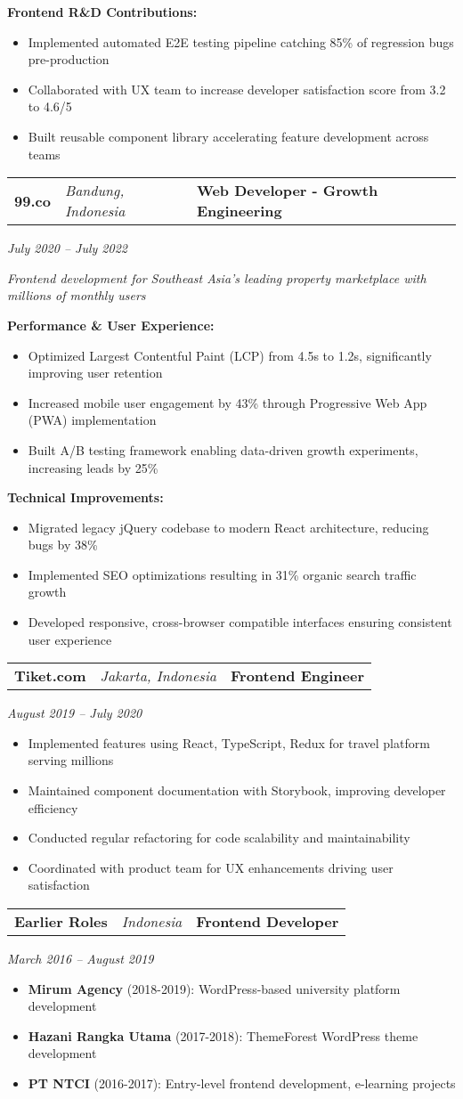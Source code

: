 \documentclass[a4paper, 11pt]{article}
\newcommand{\resumeItem}[1]{
  \item\small{
    {#1 \vspace{-2pt}}
  }
}
\newcommand{\resumeSubheading}[4]{
  \vspace{-2pt}\item
    \begin{tabularx}{0.987\textwidth}[t]{ 
  >{\raggedright\arraybackslash}X 
  >{\centering\arraybackslash}X 
  >{\raggedleft\arraybackslash}X }
      \textbf{#1} & \textit{\small#2} & \textbf{#3} \\
    \end{tabularx}
    \textit{\small#4}\\
    \vspace{-7pt}
}
\newcommand{\resumeItemListStart}{\begin{itemize}[leftmargin=0.22in]}
\newcommand{\resumeItemListEnd}{\end{itemize}\vspace{-20pt}}
\begin{document}
        \textbf{Frontend R\&D Contributions:}
        \resumeItemListStart
            \resumeItem{Implemented automated E2E testing pipeline catching 85\% of regression bugs pre-production}
            \resumeItem{Collaborated with UX team to increase developer satisfaction score from 3.2 to 4.6/5}
            \resumeItem{Built reusable component library accelerating feature development across teams}
        \resumeItemListEnd

        \resumeSubheading
        {99.co}{Bandung, Indonesia}{Web Developer - Growth Engineering}{July 2020 -- July 2022}
        \small{\textit{Frontend development for Southeast Asia's leading property marketplace with millions of monthly users}}
        \vspace{4pt}
        
        \textbf{Performance \& User Experience:}
        \resumeItemListStart
            \resumeItem{Optimized Largest Contentful Paint (LCP) from 4.5s to 1.2s, significantly improving user retention}
            \resumeItem{Increased mobile user engagement by 43\% through Progressive Web App (PWA) implementation}
            \resumeItem{Built A/B testing framework enabling data-driven growth experiments, increasing leads by 25\%}
        \resumeItemListEnd
        
        \textbf{Technical Improvements:}
        \resumeItemListStart
            \resumeItem{Migrated legacy jQuery codebase to modern React architecture, reducing bugs by 38\%}
            \resumeItem{Implemented SEO optimizations resulting in 31\% organic search traffic growth}
            \resumeItem{Developed responsive, cross-browser compatible interfaces ensuring consistent user experience}
        \resumeItemListEnd

        \resumeSubheading
        {Tiket.com}{Jakarta, Indonesia}{Frontend Engineer}{August 2019 -- July 2020}
        \resumeItemListStart
            \resumeItem{Implemented features using React, TypeScript, Redux for travel platform serving millions}
            \resumeItem{Maintained component documentation with Storybook, improving developer efficiency}
            \resumeItem{Conducted regular refactoring for code scalability and maintainability}
            \resumeItem{Coordinated with product team for UX enhancements driving user satisfaction}
        \resumeItemListEnd

        \resumeSubheading
        {Earlier Roles}{Indonesia}{Frontend Developer}{March 2016 -- August 2019}
        \resumeItemListStart
            \resumeItem{\textbf{Mirum Agency} (2018-2019): WordPress-based university platform development}
            \resumeItem{\textbf{Hazani Rangka Utama} (2017-2018): ThemeForest WordPress theme development}
            \resumeItem{\textbf{PT NTCI} (2016-2017): Entry-level frontend development, e-learning projects}
        \resumeItemListEnd
\end{document}
